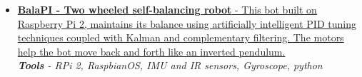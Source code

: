 \documentclass[letterpaper]{twentysecondcv} %
\begin{document}
\begin{itemize}
        \item {
                \href{https://www.researchgate.net/publication/305173847_Semi_autonomous_self_balancing_robot}
                {\normalsize\textbf{BalaPI - Two wheeled self-balancing robot} - This bot built on Raspberry Pi 2, maintains its balance using artificially intelligent PID tuning techniques coupled with Kalman and complementary filtering. The motors help the bot move back and forth like an inverted pendulum.}}\\
                \small \textit {\textbf{Tools} - RPi 2, RaspbianOS, IMU and IR sensors, Gyroscope, python}
        
\end{itemize}
\end{document}
